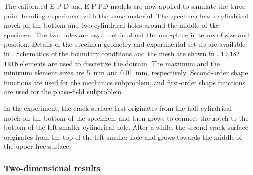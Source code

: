 

The calibrated E-P-D and E-P-PD models are now applied to simulate the three-point bending experiment with the same material. The specimen has a cylindrical notch on the bottom and two cylindrical holes around the middle of the specimen. The two holes are asymmetric about the mid-plane in terms of size and position. Details of the specimen geometry and experimental set up are available in \cite{kubik2019ductile}. Schematics of the boundary conditions and the mesh are shown in . 19,182 \texttt{TRI6} elements are used to discretize the domain. The maximum and the minimum element sizes are \SI{5}{\milli\meter} and \SI{0.01}{\milli\meter}, respectively. Second-order shape functions are used for the mechanics subproblem, and first-order shape functions are used for the phase-field subproblem.



In the experiment, the crack surface first originates from the half cylindrical notch on the bottom of the specimen, and then grows to connect the notch to the bottom of the left smaller cylindrical hole. After a while, the second crack surface originates from the top of the left smaller hole and grows towards the middle of the upper free surface.

\subsubsection{Two-dimensional results}
\label{section: Chapter5/examples/3pb/2D}

